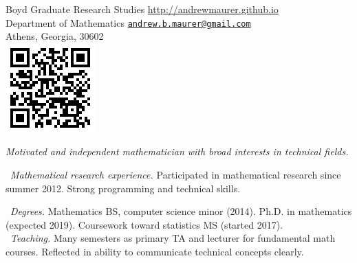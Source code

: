 \documentclass[10pt,a4paper]{article}
\begin{document}
\sloppy  %



\spacedhrule{0.9em}{-0.4em}  %


\noindent
Boyd Graduate Research Studies\tabto{7cm} \url{http://andrewmaurer.github.io} \\
Department of Mathematics \tabto{7cm} \href{mailto:andrew.b.maurer@gmail.com}{\texttt{andrew.b.maurer@gmail.com}} \\
Athens, Georgia, 30602 \ \\
\tabto{14.5cm}\includegraphics[scale=.5]{qr.png}\\

\spacedhrule{-.5em}{-.4em}


\vspace{-1.3em}  %
\begin{multicols}{2}  %
\noindent \emph{Motivated and independent mathematician with broad interests in technical fields.}

\textbullet~\textit{Mathematical research experience.} Participated in mathematical research since summer 2012. Strong programming and technical skills.

\textbullet~\textit{Degrees.} Mathematics BS, computer science minor (2014). Ph.D. in mathematics (expected 2019). Coursework toward statistics MS (started 2017).
\\
\indent~\textbullet \textit{Teaching.} Many semesters as primary TA and lecturer for fundamental math courses. Reflected in ability to communicate technical concepts clearly.
\end{multicols}

\spacedhrule{0em}{-.04em}

\end{document}
